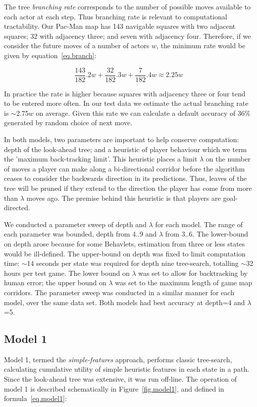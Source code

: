 \documentclass[conference]{IEEEtran}
\begin{document}
The tree \textit{branching rate} corresponds to the number of possible moves available to each actor at each step. Thus branching rate is relevant to computational tractability. Our Pac-Man map has 143 navigable squares with two adjacent squares; 32 with adjacency three; and seven with adjacency four. Therefore, if we consider the future moves of a number of actors $w$, the minimum rate would be given by equation~\ref{eq.branch}:

\begin{equation}
	\frac{143}{182}.2w + \frac{32}{182}.3w + \frac{7}{182}.4w \approx 2.25w
	\label{eq.branch}
\end{equation}

In practice the rate is higher because squares with adjacency three or four tend to be entered more often. In our test data we estimate the actual branching rate is $\sim$2.75$w$ on average. Given this rate we can calculate a default accuracy of 36\% generated by random choice of next move.

In both models, two parameters are important to help conserve computation: depth of the look-ahead tree; and a heuristic of player behaviour which we term the 'maximum back-tracking limit'. This heuristic places a limit $\lambda$ on the number of moves a player can make along a bi-directional corridor before the algorithm ceases to consider the backwards direction in its predictions. Thus, leaves of the tree will be pruned if they extend to the direction the player has come from more than $\lambda$ moves ago. The premise behind this heuristic is that players are goal-directed.

We conducted a parameter sweep of depth and $\lambda$ for each model. The range of each parameter was bounded, depth from 4..9 and $\lambda$ from 3..6. The lower-bound on depth arose because for some Behavlets, estimation from three or less states would be ill-defined. The upper-bound on depth was fixed to limit computation time: $\sim$14 seconds per state was required for depth nine tree-search, totalling $\sim$32 hours per test game. The lower bound on $\lambda$ was set to allow for backtracking by human error; the upper bound on $\lambda$ was set to the maximum length of game map corridors. The parameter sweep was conducted in a similar manner for each model, over the same data set. Both models had best accuracy at depth=4 and $\lambda$=5.


\subsection{Model 1}
Model 1, termed the \textit{simple-features} approach, performs classic tree-search, calculating cumulative utility of simple heuristic features in each state in a path. Since the look-ahead tree was extensive, it was run off-line. The operation of model 1 is described schematically in Figure~\ref{fig.model1}, and defined in formula~\ref{eq.model1}:
\end{document}
